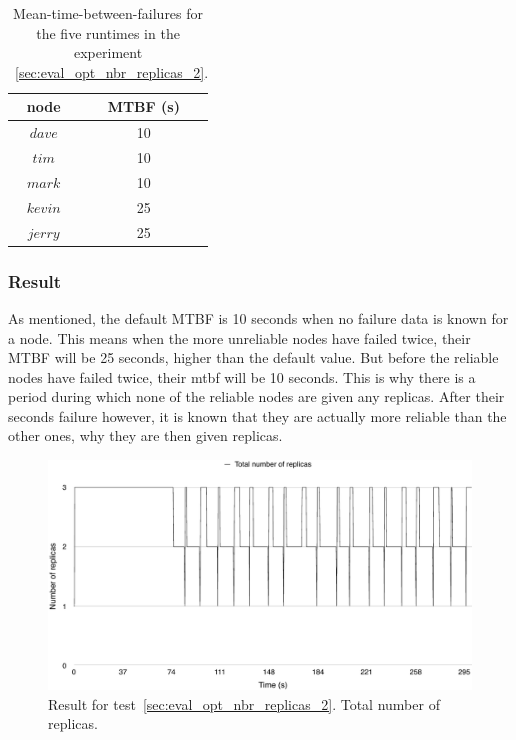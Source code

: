 \documentclass{cslthse-msc}
\begin{document}
\begin{table}[h]
	\begin{center}
	\begin{tabular}{| c  | c |}
	 \hline
	 node & MTBF (s)  \\
	 \hline		
	  $dave$ & 10 \\
	  $tim$ & 10 \\
	  $mark$ & 10 \\
	  $kevin$ & 25 \\
	  $jerry$ & 25 \\
	   \hline
	\end{tabular}
	 \caption{Mean-time-between-failures for the five runtimes in the experiment ~\ref{sec:eval_opt_nbr_replicas_2}.}
	 \label{table:exp_nodes_means_2}
	 \end{center}
 \end{table}


\subsubsection*{Result}
As mentioned, the default MTBF is 10 seconds when no failure data is known for a node. This means when the more unreliable nodes have failed twice, their MTBF will be 25 seconds, higher than the default value. But before the reliable nodes have failed twice, their mtbf will be 10 seconds. This is why there is a period during which none of the reliable nodes are given any replicas. After their seconds failure however, it is known that they are actually more reliable than the other ones, why they are then given replicas.

\begin{figure}[!hbt]
\centering
\includegraphics[scale=0.5]{images/results/optimal_replicas/2/total.pdf}
\caption{Result for test~\ref{sec:eval_opt_nbr_replicas_2}. Total number of replicas.} \label{fig:exp_opt_replicas_total_2}
\end{figure}
\end{document}
